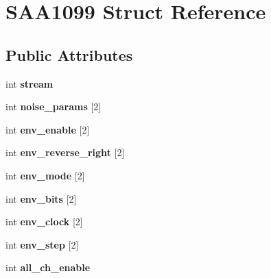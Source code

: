 \hypertarget{structSAA1099}{\section{S\-A\-A1099 Struct Reference}
\label{structSAA1099}
}
\subsection*{Public Attributes}
\begin{DoxyCompactItemize}
\item 
\hypertarget{structSAA1099_aaa11926fbb0b276aaf01525b1efb5548}{int {\bfseries stream}}\label{structSAA1099_aaa11926fbb0b276aaf01525b1efb5548}

\item 
\hypertarget{structSAA1099_af58dfa36506a4435de1f56da67b23fa3}{int {\bfseries noise\-\_\-params} \mbox{[}2\mbox{]}}\label{structSAA1099_af58dfa36506a4435de1f56da67b23fa3}

\item 
\hypertarget{structSAA1099_a7902374734a196c5c443b51611a2169a}{int {\bfseries env\-\_\-enable} \mbox{[}2\mbox{]}}\label{structSAA1099_a7902374734a196c5c443b51611a2169a}

\item 
\hypertarget{structSAA1099_a3d8d8536e97756e0486dcc5a0171f942}{int {\bfseries env\-\_\-reverse\-\_\-right} \mbox{[}2\mbox{]}}\label{structSAA1099_a3d8d8536e97756e0486dcc5a0171f942}

\item 
\hypertarget{structSAA1099_aa7194af368f07449a2e769245ab188ac}{int {\bfseries env\-\_\-mode} \mbox{[}2\mbox{]}}\label{structSAA1099_aa7194af368f07449a2e769245ab188ac}

\item 
\hypertarget{structSAA1099_af91525b03f48f442ec5442a3565fe5af}{int {\bfseries env\-\_\-bits} \mbox{[}2\mbox{]}}\label{structSAA1099_af91525b03f48f442ec5442a3565fe5af}

\item 
\hypertarget{structSAA1099_ad6cb68e53be51fda8d13de3e27169772}{int {\bfseries env\-\_\-clock} \mbox{[}2\mbox{]}}\label{structSAA1099_ad6cb68e53be51fda8d13de3e27169772}

\item 
\hypertarget{structSAA1099_a9aa9ae347843c3957c3956638ca842f9}{int {\bfseries env\-\_\-step} \mbox{[}2\mbox{]}}\label{structSAA1099_a9aa9ae347843c3957c3956638ca842f9}

\item 
\hypertarget{structSAA1099_aae4713e5665ddc075245e9622f8c9268}{int {\bfseries all\-\_\-ch\-\_\-enable}}\label{structSAA1099_aae4713e5665ddc075245e9622f8c9268}


\end{DoxyCompactItemize}
